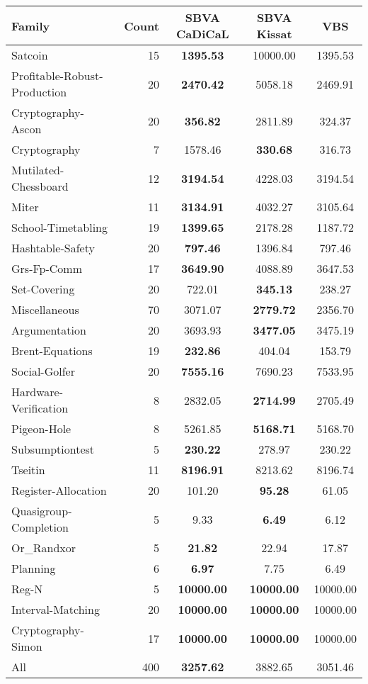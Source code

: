 \begin{tabular}{lr|cc|c}
\toprule
Family & Count & SBVA CaDiCaL & SBVA Kissat & VBS \\
\midrule
Satcoin & 15 & \bfseries 1395.53 & 10000.00 & 1395.53 \\
Profitable-Robust-Production & 20 & \bfseries 2470.42 & 5058.18 & 2469.91 \\
Cryptography-Ascon & 20 & \bfseries 356.82 & 2811.89 & 324.37 \\
Cryptography & 7 & 1578.46 & \bfseries 330.68 & 316.73 \\
Mutilated-Chessboard & 12 & \bfseries 3194.54 & 4228.03 & 3194.54 \\
Miter & 11 & \bfseries 3134.91 & 4032.27 & 3105.64 \\
School-Timetabling & 19 & \bfseries 1399.65 & 2178.28 & 1187.72 \\
Hashtable-Safety & 20 & \bfseries 797.46 & 1396.84 & 797.46 \\
Grs-Fp-Comm & 17 & \bfseries 3649.90 & 4088.89 & 3647.53 \\
Set-Covering & 20 & 722.01 & \bfseries 345.13 & 238.27 \\
Miscellaneous & 70 & 3071.07 & \bfseries 2779.72 & 2356.70 \\
Argumentation & 20 & 3693.93 & \bfseries 3477.05 & 3475.19 \\
Brent-Equations & 19 & \bfseries 232.86 & 404.04 & 153.79 \\
Social-Golfer & 20 & \bfseries 7555.16 & 7690.23 & 7533.95 \\
Hardware-Verification & 8 & 2832.05 & \bfseries 2714.99 & 2705.49 \\
Pigeon-Hole & 8 & 5261.85 & \bfseries 5168.71 & 5168.70 \\
Subsumptiontest & 5 & \bfseries 230.22 & 278.97 & 230.22 \\
Tseitin & 11 & \bfseries 8196.91 & 8213.62 & 8196.74 \\
Register-Allocation & 20 & 101.20 & \bfseries 95.28 & 61.05 \\
Quasigroup-Completion & 5 & 9.33 & \bfseries 6.49 & 6.12 \\
Or\_Randxor & 5 & \bfseries 21.82 & 22.94 & 17.87 \\
Planning & 6 & \bfseries 6.97 & 7.75 & 6.49 \\
Reg-N & 5 & \bfseries 10000.00 & \bfseries 10000.00 & 10000.00 \\
Interval-Matching & 20 & \bfseries 10000.00 & \bfseries 10000.00 & 10000.00 \\
Cryptography-Simon & 17 & \bfseries 10000.00 & \bfseries 10000.00 & 10000.00 \\
\hline All & 400 & \bfseries 3257.62 & 3882.65 & 3051.46 \\
\bottomrule
\end{tabular}

